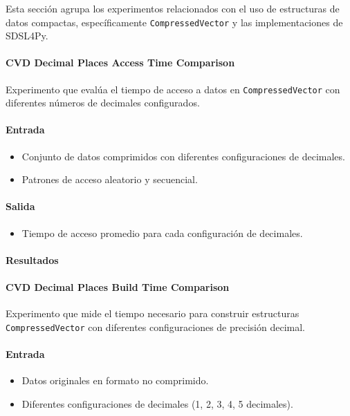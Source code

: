 Esta sección agrupa los experimentos relacionados con el uso de estructuras de datos compactas, específicamente \texttt{CompressedVector} y las implementaciones de SDSL4Py.

\paragraph{CVD Decimal Places Access Time Comparison}
\label{cvd_decimal_places_access_time}

Experimento que evalúa el tiempo de acceso a datos en \texttt{CompressedVector} con diferentes números de decimales configurados.

\paragraph{Entrada}
\begin{itemize}
    \item Conjunto de datos comprimidos con diferentes configuraciones de decimales.
    \item Patrones de acceso aleatorio y secuencial.
\end{itemize}

\paragraph{Salida}
\begin{itemize}
    \item Tiempo de acceso promedio para cada configuración de decimales.
\end{itemize}

\paragraph{Resultados}
\vspace{0.5em}
\noindent

\CVDDecimalPlacesAccessTimeComparison
\newpage



\paragraph{CVD Decimal Places Build Time Comparison}
\label{cvd_decimal_places_build_time}

Experimento que mide el tiempo necesario para construir estructuras \texttt{CompressedVector} con diferentes configuraciones de precisión decimal.

\paragraph{Entrada}
\begin{itemize}
    \item Datos originales en formato no comprimido.
    \item Diferentes configuraciones de decimales (1, 2, 3, 4, 5 decimales).
\end{itemize}

